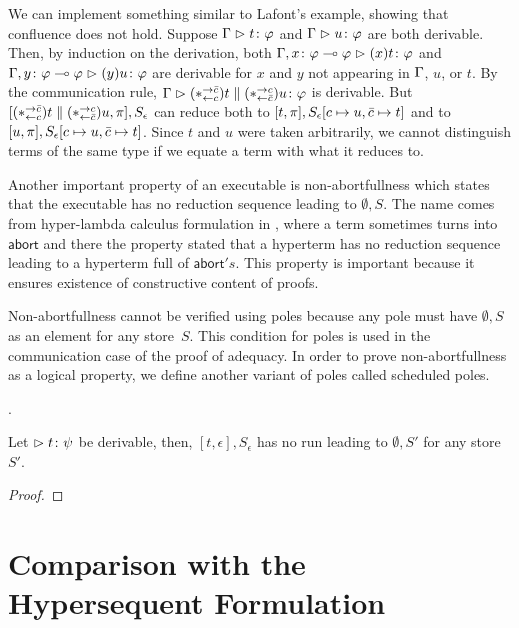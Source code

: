 We can implement something similar to Lafont's example,
showing that confluence does not hold.
Suppose $\Gamma\vartriangleright{t} \colon{\varphi}$ and $\Gamma\vartriangleright{u} \colon{\varphi}$ are both derivable.
Then, by induction on the derivation,
both $\Gamma,{x} \colon{\varphi\multimap\varphi}\vartriangleright{(x)t} \colon{\varphi}$
and $\Gamma,{y} \colon{\varphi\multimap\varphi}\vartriangleright{(y)u} \colon{\varphi}$ are derivable
for $x$ and $y$ not appearing in $\Gamma$, $u$, or $t$.
By the communication rule,
$\Gamma\vartriangleright{(\ast^{\rightarrow {\bar{c}}}_{\leftarrow{c}})t\parallel(\ast^{\rightarrow {c}}_{\leftarrow{\bar{c}}})u} \colon{\varphi}$ is derivable.
But $[(\ast^{\rightarrow {\bar{c}}}_{\leftarrow{c}})t\parallel (\ast^{\rightarrow {c}}_{\leftarrow{\bar{c}}})u,
\pi],S_\epsilon$
can reduce both to $[t,\pi], S_\epsilon[c\mapsto u, \bar{c}\mapsto t]$
and to $[u,\pi], S_\epsilon[c\mapsto u,\bar{c}\mapsto t]$.
Since $t$ and $u$ were taken arbitrarily, we cannot distinguish terms
of the same type if we equate a term with what it reduces to.


Another important property of an executable is
non-abortfullness
which states that the executable has no reduction sequence leading to
$\emptyset,S$.
The name comes from hyper-lambda calculus formulation in ,
where a term sometimes turns into $\mathsf{abort}$ and there the property
stated that a hyperterm has no reduction sequence leading to a hyperterm
full of $\mathsf{abort}'s$.
This property is important because it ensures existence of
constructive content of proofs.

Non-abortfullness cannot be verified using poles
because any pole must have $\emptyset,S$ as an element for
any store~$S$.
This condition for poles is used in the
communication case of the proof of adequacy.
In order to prove non-abortfullness as a logical property,
we define another variant of poles called scheduled poles.


.


\newcommand{\sche}{\sqsubseteq}

\begin{proposition}
Let $\vartriangleright{t} \colon{\psi}$ be derivable, then,
 $[t,\epsilon], S_\epsilon$ has no run leading to $\emptyset, S'$ for
 any store $S'$.
\end{proposition}
\begin{proof}
\end{proof}



\section{Comparison with the Hypersequent Formulation}


